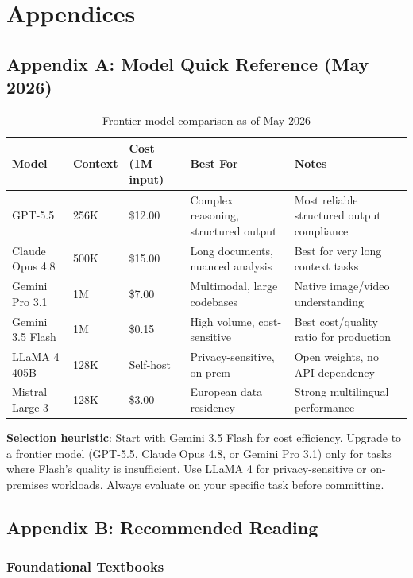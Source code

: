 \chapter{Appendices}
\label{ch:appendices}

\section{Appendix A: Model Quick Reference (May 2026)}

\begin{table}[htbp]
\centering
\caption{Frontier model comparison as of May 2026}
\label{tab:model-comparison}
\begin{tabularx}{\textwidth}{p{2.5cm}p{1.5cm}p{1.5cm}p{2cm}X}
\toprule
\textbf{Model} & \textbf{Context} & \textbf{Cost (1M input)} & \textbf{Best For} & \textbf{Notes} \\
\midrule
GPT-5.5 & 256K & \$12.00 & Complex reasoning, structured output & Most reliable structured output compliance \\
\midrule
Claude Opus 4.8 & 500K & \$15.00 & Long documents, nuanced analysis & Best for very long context tasks \\
\midrule
Gemini Pro 3.1 & 1M & \$7.00 & Multimodal, large codebases & Native image/video understanding \\
\midrule
Gemini 3.5 Flash & 1M & \$0.15 & High volume, cost-sensitive & Best cost/quality ratio for production \\
\midrule
LLaMA 4 405B & 128K & Self-host & Privacy-sensitive, on-prem & Open weights, no API dependency \\
\midrule
Mistral Large 3 & 128K & \$3.00 & European data residency & Strong multilingual performance \\
\bottomrule
\end{tabularx}
\end{table}

\textbf{Selection heuristic}: Start with Gemini 3.5 Flash for cost efficiency. Upgrade to a frontier model (GPT-5.5, Claude Opus 4.8, or Gemini Pro 3.1) only for tasks where Flash's quality is insufficient. Use LLaMA 4 for privacy-sensitive or on-premises workloads. Always evaluate on your specific task before committing.


\section{Appendix B: Recommended Reading}

\subsection{Foundational Textbooks}

